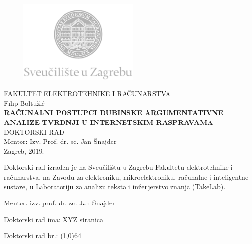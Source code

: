 \documentclass[12pt,oneside, a4paper]{book}
\begin{document}
\begin{titlepage}
  \fontsize{16pt}{20pt}\selectfont
  \selectfont
  \setlength{\intextsep}{0pt plus 0pt minus 0pt}

  \begin{center}
    \begin{figure}[ht!]
      \begin{center}
        \includegraphics[height=4.1184cm, width=5.94cm]{logo_unizg2}
      \end{center}
    \end{figure}		
    \vspace{0cm}
    {FAKULTET ELEKTROTEHNIKE I RAČUNARSTVA} \\
    \vspace{3cm}
    Filip Boltužić \\
    \vspace{2cm}
    {\fontsize{22pt}{22pt}\selectfont\textbf{
RAČUNALNI POSTUPCI DUBINSKE ARGUMENTATIVNE ANALIZE TVRDNJI U INTERNETSKIM RASPRAVAMA
}} \\
    \vspace{2cm}    
    DOKTORSKI RAD \\
    \vspace{5cm}    %
	Mentor: Izv. Prof. dr. sc. Jan Šnajder \\
    \vfill{Zagreb, 2019.}
  \end{center}
  \restoregeometry
\end{titlepage}


\begin{titlepage}
  \begin{minipage}{\dimexpr\textwidth-1cm}
    \vspace{3cm}
    Doktorski rad izrađen je na Sveučilištu u Zagrebu
    Fakultetu elektrotehnike i računarstva, na Zavodu za 
    elektroniku, mikroelektroniku, računalne i inteligentne sustave, u 
    Laboratoriju za analizu teksta i inženjerstvo znanja (TakeLab).

    \vspace{1cm}
    Mentor: izv. prof. dr. sc. Jan Šnajder

    \vspace{1cm}
    Doktorski rad ima: XYZ stranica

    \vspace{1cm}
    Doktorski rad br.: \line(1,0){64}
  \end{minipage}
\end{titlepage}
\end{document}
